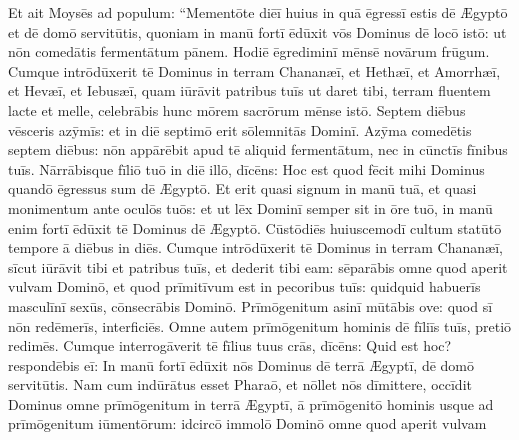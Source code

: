 Et ait
Moysēs ad populum: ``Mementōte diēī huius in
quā ēgressī estis dē Ægyptō et dē domō servitūtis, quoniam in manū fortī
ēdūxit vōs Dominus dē locō istō: ut nōn comedātis fermentātum pānem. Hodiē ēgrediminī mēnsē
novārum frūgum. Cumque intrōdūxerit tē Dominus in terram
Chananæī, et Hethæī, et Amorrhæī, et Hevæī, et Iebusæī,
quam iūrāvit patribus tuīs ut daret tibi, terram fluentem
lacte et melle, celebrābis hunc mōrem sacrōrum mēnse istō.
Septem diēbus vēsceris azȳmīs: et in diē septimō erit
sōlemnitās Dominī. Azȳma comedētis septem diēbus: nōn appārēbit
apud tē aliquid fermentātum, nec in cūnctīs fīnibus tuīs. Nārrābisque
fīliō tuō in diē illō, dīcēns: Hoc est quod fēcit mihi Dominus quandō
ēgressus sum dē Ægyptō. Et erit quasi signum in manū tuā, et quasi
monimentum ante oculōs tuōs: et ut lēx Dominī semper sit
in ōre tuō, in manū enim fortī ēdūxit tē Dominus dē Ægyptō. Cūstōdiēs
huiuscemodī cultum statūtō tempore ā diēbus in diēs. Cumque intrōdūxerit
tē Dominus in terram Chananæī, sīcut iūrāvit tibi et patribus tuīs, et
dederit tibi eam: sēparābis omne quod aperit vulvam
Dominō, et quod prīmitīvum est in pecoribus tuīs: quidquid
habuerīs masculīnī sexūs, 
cōnsecrābis Dominō. Prīmōgenitum asinī mūtābis ove: quod sī nōn redēmerīs,
interficiēs. Omne autem prīmōgenitum hominis dē fīliīs tuīs, pretiō
redimēs. Cumque interrogāverit tē fīlius tuus crās, dīcēns: Quid est
hoc? respondēbis eī: In manū fortī ēdūxit nōs Dominus dē terrā Ægyptī, dē
domō servitūtis. Nam cum indūrātus esset
Pharaō, et nōllet nōs dīmittere, occīdit Dominus omne
prīmōgenitum in terrā Ægyptī, ā prīmōgenitō hominis usque
ad prīmōgenitum iūmentōrum: idcircō
immolō Dominō omne quod aperit vulvam
